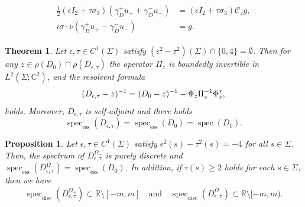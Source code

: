 \documentclass[10pt,a4paper]{amsart}
\newtheorem{theorem}{Theorem}
\newtheorem{proposition}{Proposition}
\def \rr {{\mathbb R}}
\DeclareMathOperator{\spec}{spec}
\newcommand{\specd}{\spec_\mathrm{disc}}
\newcommand{\spece}{\spec_\mathrm{ess}}
\begin{document}
\begin{align}\label{Traceeigen}
\begin{split}
\frac{1}{2}(\epsilon I_2+\tau\sigma_3)(\gamma_D^+ u_+ +\gamma_D^- u_-)&=(\epsilon I_2+\tau\sigma_3)\mathscr{C}_zg,\\
 i\sigma\cdot\nu(\gamma_D^+ u_+ -\gamma_D^- u_-)&=g.
 \end{split}
\end{align}

\begin{theorem}\label{main_th1}Let $\epsilon,\tau\in C^1(\Sigma)$ satisfy $(\epsilon^2-\tau^2)(\Sigma) \cap\{0, 4\}=\emptyset$. Then for any $z \in \rho(D_0)\cap\rho(D_{\epsilon, \tau})$ the operator $ \Pi_{z}$ is boundedly invertible in $L^2(\Sigma; \mathbb{C}^2)$, and the resolvent formula
			\begin{equation}\label{Krein}
				(D_{\epsilon, \tau} - z)^{-1} = (D_0 - z)^{-1} - \Phi_{z} \Pi_{z}^{-1} \Phi_{\Bar{z}}^*,
\end{equation}				
holds. Moreover, $D_{\epsilon,\tau}$ is self-adjoint and there holds 
 \[
 \spece (D_{\epsilon,\tau})=\spece (D_0)=\spec (D_0).
 \]			
\end{theorem}

\begin{proposition}\label{Spec_H} Let $\epsilon,\tau\in C^1(\Sigma)$ satisfy $\epsilon^2(s)-\tau^2(s)= -4$ for all $s\in\Sigma$. Then, the spectrum of $D_{\epsilon,\tau}^{\Omega_+}$ is purely discrete and  $\spece(D_{\epsilon,\tau}^{\Omega_-})=\spece(D_0)$. In addition, if $\tau(s)\geq2$ 
holds for each $s\in\Sigma$, then we have
\[
\specd(D_{\epsilon,\tau}^{\Omega_+})\subset \rr\setminus [-m,m] \quad \text{and}\quad \specd(D_{\epsilon,\tau}^{\Omega_-})\subset \rr\setminus [-m,m).
\]
\end{proposition}
\end{document}
